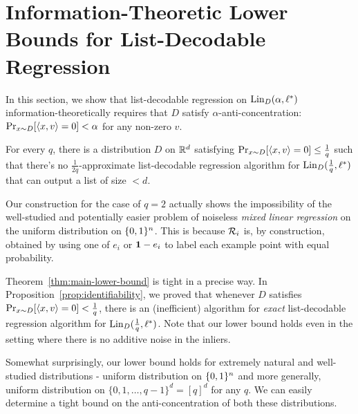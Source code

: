 
\section{Information-Theoretic Lower Bounds for List-Decodable Regression} \label{sec:lower-bound}
In this section, we show that list-decodable regression on $\mathrm{Lin}_D(\alpha,\ell^*)$ information-theoretically requires that $D$ satisfy $\alpha$-anti-concentration: $\Pr_{x \sim D}[ \langle x,v\rangle = 0] < \alpha$ for any non-zero $v$. 

\begin{theorem} \label{thm:main-lower-bound}
For every $q$, there is a distribution $D$ on $\mathbb R^d$ satisfying $\Pr_{x \sim D}[ \langle x,v\rangle = 0] \leq \frac{1}{q}$ such that there's no $\frac{1}{2q}$-approximate list-decodable regression algorithm for $\mathrm{Lin}_D(\frac{1}{q},\ell^*)$ that can output a list of size $< d$.  
\end{theorem}
\begin{remark}
Our construction for the case of $q = 2$ actually shows the impossibility of the well-studied and potentially easier problem of noiseless \emph{mixed linear regression} on the uniform distribution on $\{0,1\}^n$. This is because $\mathcal R_i$ is, by construction, obtained by using one of  $e_i$ or $\bm{1}-e_i$ to label each example point with equal probability. 
\end{remark}

Theorem~\ref{thm:main-lower-bound} is tight in a precise way. In Proposition~\ref{prop:identifiability}, we proved that whenever $D$ satisfies $\Pr_{x \sim D} [\langle x,v\rangle =0] < \frac{1}{q}$, there is an (inefficient) algorithm for \emph{exact} list-decodable regression algorithm for $\mathrm{Lin}_D(\frac{1}{q},\ell^*)$. Note that our lower bound holds even in the setting where there is no additive noise in the inliers. 

Somewhat surprisingly, our lower bound holds for extremely natural and well-studied distributions - uniform distribution on $\{0,1\}^n$ and more generally, uniform distribution on $\{0,1,\ldots,q-1\}^d = [q]^d$ for any $q$. We can easily determine a tight bound on the anti-concentration of both these distributions. 



